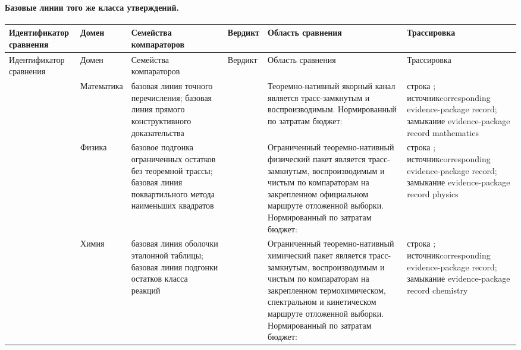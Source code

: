 \paragraph{Базовые линии того же класса утверждений.}
\begingroup
\scriptsize
\setlength{\emergencystretch}{1.5em}
\setlength{\tabcolsep}{2pt}
\setlength{\LTleft}{0pt}
\setlength{\LTright}{0pt}
\begin{longtable}{@{}L{0.14\textwidth}L{0.10\textwidth}L{0.17\textwidth}L{0.10\textwidth}L{0.23\textwidth}L{0.18\textwidth}@{}}
\toprule
Идентификатор сравнения & Домен & Семейства компараторов & Вердикт & Область сравнения & Трассировка \\
\midrule
\endfirsthead
\toprule
Идентификатор сравнения & Домен & Семейства компараторов & Вердикт & Область сравнения & Трассировка \\
\midrule
\endhead
{} & Математика & базовая линия точного перечисления; базовая линия прямого конструктивного доказательства &  & Теоремно-нативный якорный канал является трасс-замкнутым и воспроизводимым. \allowbreak Нормированный по затратам бюджет:  & строка ; \allowbreak источникcorresponding evidence-package record; \allowbreak замыкание evidence-package record mathematics \\
 & Физика & базовое подгонка ограниченных остатков без теоремной трассы; базовая линия поквартильного метода наименьших квадратов &  & Ограниченный теоремно-нативный физический пакет является трасс-замкнутым, воспроизводимым и чистым по компараторам на закрепленном официальном маршруте отложенной выборки. \allowbreak Нормированный по затратам бюджет:  & строка ; \allowbreak источникcorresponding evidence-package record; \allowbreak замыкание evidence-package record physics \\
 & Химия & базовая линия оболочки эталонной таблицы; базовая линия подгонки остатков класса реакций &  & Ограниченный теоремно-нативный химический пакет является трасс-замкнутым, воспроизводимым и чистым по компараторам на закрепленном термохимическом, спектральном и кинетическом маршруте отложенной выборки. \allowbreak Нормированный по затратам бюджет:  & строка ; \allowbreak источникcorresponding evidence-package record; \allowbreak замыкание evidence-package record chemistry \\

\end{longtable}
